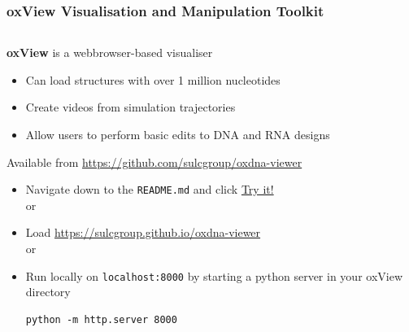 \documentclass[slidestop,compress,9pt]{beamer}
\begin{document}
\begin{frame}
\end{frame}

\begin{frame}[fragile]
\frametitle{oxView Visualisation and Manipulation Toolkit}
\small

\begin{columns}

\begin{column}{0.6\textwidth}
\textbf{oxView} is a webbrowser-based visualiser
\begin{itemize}
\item Can load structures with over 1 million nucleotides
\item Create videos from simulation trajectories
\item Allow users to perform basic edits to DNA and RNA designs
\end{itemize}
\vspace*{0.25cm}
Available from \href{https://github.com/sulcgroup/oxdna-viewer}{https://github.com/sulcgroup/oxdna-viewer}
\begin{itemize}
\item Navigate down to the \texttt{README.md} and click \href{https://sulcgroup.github.io/oxdna-viewer}{Try it!}\\or
\item Load \href{https://sulcgroup.github.io/oxdna-viewer}{https://sulcgroup.github.io/oxdna-viewer}\\or
\item Run locally on \texttt{localhost:8000} by starting a python server in your oxView directory
\begin{lstlisting}
python -m http.server 8000
\end{lstlisting}
\end{itemize}


\end{column}
\end{columns}
\end{frame}
\end{document}
